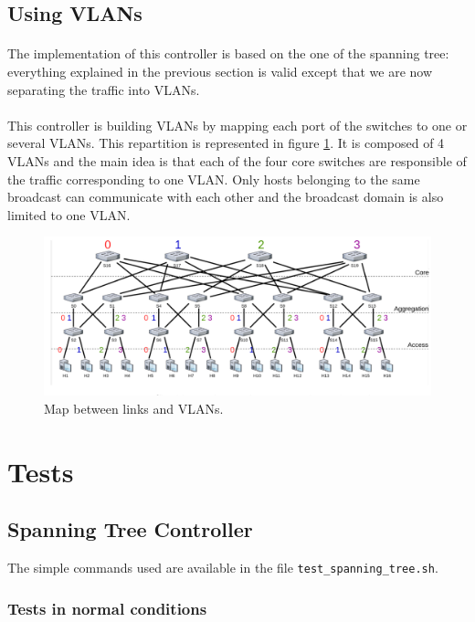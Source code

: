 \documentclass[a4paper, 11pt, oneside]{article}
\begin{document}
\subsection{Using VLANs}
\paragraph{}The implementation of this controller is based on the one of the spanning tree: everything explained in the previous section is valid except that we are now separating the traffic into VLANs.
\paragraph{}This controller is building VLANs by mapping each port of the switches to one or several VLANs. This repartition is represented in figure \ref{VLANs_rep}. It is composed of 4 VLANs and the main idea is that each of the four core switches are responsible of the traffic corresponding to one VLAN. 
Only hosts belonging to the same broadcast can communicate with each other and the broadcast domain is also limited to one VLAN.

\begin{figure}[H]
    \center
    \includegraphics[scale = 0.4]{VLANs/VLANs.png}
    \caption{Map between links and VLANs.}
    \label{VLANs_rep}
    \end{figure}

\section{Tests}

\subsection{Spanning Tree Controller}
The simple commands used are available in the file \texttt{test\_spanning\_tree.sh}.
\subsubsection{Tests in normal conditions}
\end{document}
